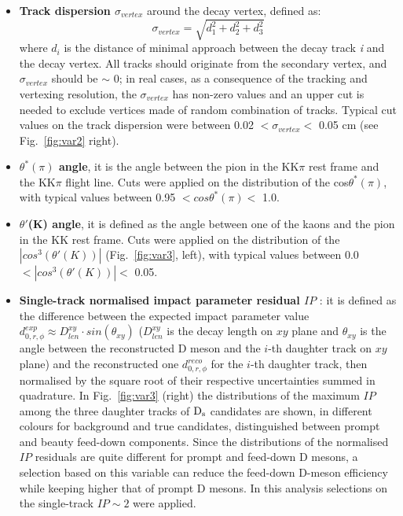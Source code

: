 \begin{itemize}
\item \textbf{Track dispersion $\sigma_{vertex}$} around the decay vertex, defined as:
\[
\sigma_{vertex}=\sqrt{d^2_1+d^2_2+d^2_3}
\]
where $d_i$ is the distance of minimal approach between the decay 
track \textit{i} and the decay vertex. All tracks should originate from 
the secondary vertex, and $\sigma_{vertex}$ should be $\sim$ 0; in 
real cases, as a consequence of the tracking and vertexing resolution, 
the $\sigma_{vertex}$ has non-zero values and an upper cut is needed 
to exclude vertices made of random combination of tracks. Typical cut
 values on the track dispersion were between 0.02 $< \sigma_{vertex}<$ 0.05 cm 
 (see Fig.~\ref{fig:var2} right).
\item \textbf{$\theta^*(\pi)$ angle}, it is the angle between the pion 
in the KK$\pi$ rest frame and the KK$\pi$ flight line. Cuts were applied
 on the distribution of the cos$\theta^*(\pi)$, with typical values 
 between 0.95 $<cos\theta^*(\pi)  <$ 1.0.
\item \textbf{$\theta'$(K) angle}, it is defined as the angle between
 one of the kaons and the pion in the KK rest frame. Cuts were 
 applied on the distribution of the $|cos^3(\theta'(K))|$ (Fig.~\ref{fig:var3}, left), with typical 
 values between 0.0 $<|cos^3(\theta'(K))| <$ 0.05.
\item \textbf{Single-track normalised impact parameter residual $IP$} : it is defined 
as the difference between the expected 
impact parameter value $d^{exp}_{0,r,\phi} \approx D_{len}^{xy} \cdot sin(\theta_{xy})$
 ($D_{len}^{xy}$ is the decay length on $xy$ plane and $\theta_{xy}$ is the angle 
between the reconstructed D meson and the $i$-th daughter track on $xy$ plane) 
and the reconstructed one $d^{reco}_{0,r,\phi}$ for the $i$-th daughter
track, then normalised by the square 
root of their respective uncertainties summed in quadrature. 
In Fig.~\ref{fig:var3} (right) the distributions of the maximum $IP$ among 
the three daughter tracks of ${\rm D_s}$ candidates are shown, in different colours for
background and true candidates, distinguished between prompt and beauty 
feed-down components. Since the distributions of the normalised $IP$ residuals 
are quite different for prompt and feed-down D mesons, 
a selection based on this variable can reduce the feed-down D-meson efficiency while keeping 
higher that of prompt D mesons. In this analysis selections on the single-track $IP \sim 2$
were applied.
\end{itemize}

